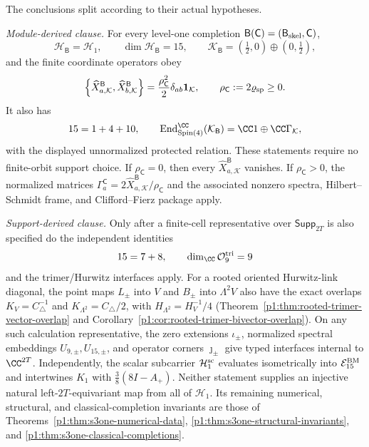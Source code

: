 \documentclass[11pt]{article}
\begin{document}
\begin{corollary}
\label{p1:cor:s3one-finite-package}
The conclusions split according to their actual hypotheses.

\smallskip
\noindent\emph{Module-derived clause.}
For every level-one completion
\(\mathsf B(\mathsf C)=(\mathsf B_{\rm skel},\mathsf C)\),
\[
\mathcal H_{\mathsf B}=\mathcal H_1,
\qquad
\dim\mathcal H_{\mathsf B}=15,
\qquad
\mathcal K_{\mathsf B}=(\tfrac12,0)\oplus(0,\tfrac12),
\]
and the finite coordinate operators obey
\[
\left\{
\widehat X_{a,\mathcal K}^{\mathsf B},
\widehat X_{b,\mathcal K}^{\mathsf B}
\right\}
=
\frac{\rho_{\mathsf C}^2}{2}\delta_{ab}\mathbf1_{\mathcal K},
\qquad
\rho_{\mathsf C}:=2\varrho_{\rm sp}\ge0.
\]
It also has
\[
15=1+4+10,
\qquad
\operatorname{End}_{\operatorname{Spin}(4)}^{\CC}(\mathcal K_{\mathsf B})
=\CC1\oplus\CC\Gamma_{\mathcal K},
\]
with the displayed unnormalized protected relation.  These statements require
no finite-orbit support choice.  If \(\rho_{\mathsf C}=0\), then every
\(\widehat X_{a,\mathcal K}^{\mathsf B}\) vanishes.  If
\(\rho_{\mathsf C}>0\), the normalized matrices
\(\Gamma_a^{\mathsf C}=2\widehat X_{a,\mathcal K}^{\mathsf B}/\rho_{\mathsf C}\)
and the associated nonzero spectra, Hilbert--Schmidt frame, and
Clifford--Fierz package apply.

\smallskip
\noindent\emph{Support-derived clause.}
Only after a finite-cell representative over \(\mathsf{Supp}_{2T}\) is also
specified do the independent identities
\[
 15=7+8,
 \qquad
 \dim_\CC\mathcal O_9^{\rm tri}=9
\]
and the trimer/Hurwitz interfaces apply.
For a rooted oriented Hurwitz-link diagonal, the point maps
\(L_\pm\) into \(V\) and \(B_\pm\) into \(\Lambda^2V\)
also have the exact overlaps
\(K_V=C_\triangle^{-1}\) and
\(K_{\Lambda^2}=C_\triangle/2\), with
\(H_{\Lambda^2}=H_V^{-1}/4\)
(Theorem~\ref{p1:thm:rooted-trimer-vector-overlap} and
Corollary~\ref{p1:cor:rooted-trimer-bivector-overlap}).
On any such calculation
representative, the zero
extensions \(\iota_\pm\), normalized spectral embeddings
\(U_{9,\pm},U_{15,\pm}\), and operator corners \(\jmath_\pm\) give typed
interfaces internal to \(\CC^{2T}\).  Independently, the scalar subcarrier
\(\mathcal H_1^{\rm sc}\) evaluates isometrically into
\(\mathcal E_{15}^{\rm BM}\) and intertwines \(K_1\) with
\(\frac38(8I-A_+)\).  Neither statement supplies an injective natural
left-\(2T\)-equivariant map from all of \(\mathcal H_1\).
Its remaining numerical, structural, and classical-completion invariants are
those of
Theorems~\ref{p1:thm:s3one-numerical-data},
\ref{p1:thm:s3one-structural-invariants}, and
\ref{p1:thm:s3one-classical-completions}.
\end{corollary}
\end{document}
